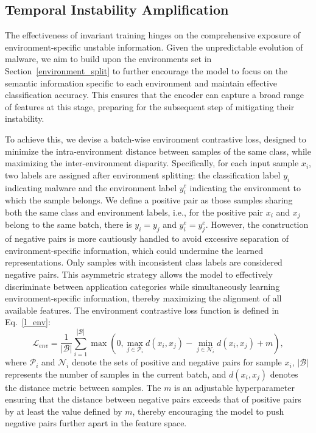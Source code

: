 \subsection{Temporal Instability Amplification}
The effectiveness of invariant training hinges on the comprehensive exposure of environment-specific unstable information. Given the unpredictable evolution of malware, we aim to build upon the environments set in Section~\ref{environment_split} to further encourage the model to focus on the semantic information specific to each environment and maintain effective classification accuracy. This ensures that the encoder can capture a broad range of features at this stage, preparing for the subsequent step of mitigating their instability. 

To achieve this, we devise a batch-wise environment contrastive loss, designed to minimize the intra-environment distance between samples of the same class, while maximizing the inter-environment disparity. Specifically, for each input sample $x_i$, two labels are assigned after environment splitting: the classification label $y_i$ indicating malware and the environment label $y_i^e$ indicating the environment to which the sample belongs. We define a positive pair as those samples sharing both the same class and environment labels, i.e., for the positive pair $x_i$ and $x_j$ belong to the same batch, there is $y_i = y_j$ and $y_i^e = y_j^e$. However, the construction of negative pairs is more cautiously handled to avoid excessive separation of environment-specific information, which could undermine the learned representations. Only samples with inconsistent class labels are considered negative pairs. This asymmetric strategy allows the model to effectively discriminate between application categories while simultaneously learning environment-specific information, thereby maximizing the alignment of all available features. The environment contrastive loss function is defined in Eq.~\ref{l_env}:
\begin{equation}
\label{l_env}
\mathcal{L}_{env} = \frac{1}{|\mathcal{B}|} \sum_{i=1}^{|\mathcal{B}|} \max\left(0, \max _{j \in \mathcal{P}_i} d\left(x_i, x_j\right) - \min _{j \in \mathcal{N}_i} d\left(x_i, x_j\right) + m \right),
\end{equation}
where $\mathcal{P}_i$ and $\mathcal{N}_i$ denote the sets of positive and negative pairs for sample $x_i$, $|\mathcal{B}|$ represents the number of samples in the current batch, and $d\left(x_i, x_j\right)$ denotes the distance metric between samples. The $m$ is an adjustable hyperparameter ensuring that the distance between negative pairs exceeds that of positive pairs by at least the value defined by $m$, thereby encouraging the model to push negative pairs further apart in the feature space.

